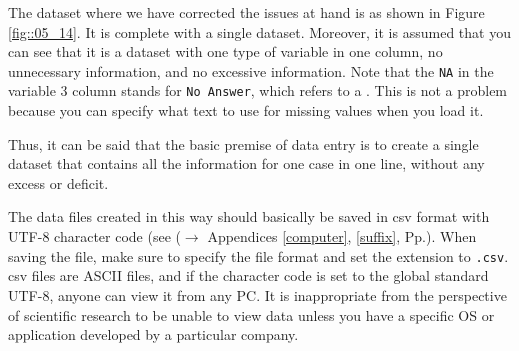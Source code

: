 \documentclass{ltjsbook}
\begin{document}
The dataset where we have corrected the issues at hand is as shown in Figure \ref{fig::05_14}. It is complete with a single dataset. Moreover, it is assumed that you can see that it is a dataset with one type of variable in one column, no unnecessary information, and no excessive information. Note that the \texttt{NA} in the variable 3 column stands for \texttt{No Answer}, which refers to a . This is not a problem because you can specify what text to use for missing values when you load it.


Thus, it can be said that the basic premise of data entry is to create a single dataset that contains all the information for one case in one line, without any excess or deficit.

The data files created in this way should basically be saved in csv format with UTF-8 character code (see ($\to$ Appendices \ref{computer}, \ref{suffix}, Pp.\pageref{suffix}). When saving the file, make sure to specify the file format and set the extension to \texttt{.csv}. csv files are ASCII files, and if the character code is set to the global standard UTF-8, anyone can view it from any PC. It is inappropriate from the perspective of scientific research to be unable to view data unless you have a specific OS or application developed by a particular company.
\end{document}
